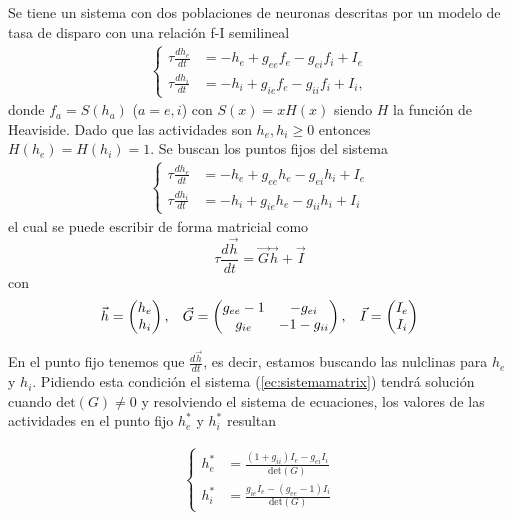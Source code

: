 \documentclass[11pt,twocolumn,twoside]{opticajnl}
\begin{document}
Se tiene un sistema con dos poblaciones de neuronas descritas por un modelo de tasa de disparo con una relación f-I semilineal
\begin{align}
    \left\{
    \begin{aligned}
    \tau \frac{d h_e}{dt} &= -h_e + g_{ee}f_e - g_{ei}f_i + I_e \\
    \tau \frac{d h_i}{dt} &= -h_i + g_{ie}f_e - g_{ii}f_i + I_i,
    \end{aligned}
\right.
\label{ec:sistema}
\end{align}
donde $f_a = S(h_a)$ ($a=e,i$) con $S(x) = x H(x) $ siendo $H$ la función de Heaviside. Dado que las actividades son $h_e, h_i \geq 0$ entonces $H(h_e) = H(h_i) = 1$. Se buscan los puntos fijos del sistema 
\begin{align}
    \left\{
    \begin{aligned}
        \tau \frac{d h_e}{dt} &= -h_e + g_{ee}h_e - g_{ei}h_i + I_e \\
        \tau \frac{d h_i}{dt} &= -h_i + g_{ie}h_e - g_{ii}h_i + I_i 
    \end{aligned}
    \right.
    \label{ec:sistema2}
\end{align}
el cual se puede escribir de forma matricial como 
\begin{equation}
    \tau \frac{d \vec{h}}{dt} = \vec{G} \vec{h} + \vec{I}
    \label{ec:sistemamatrix}
\end{equation}
con 
\[
\vec{h} = \begin{pmatrix} h_e \\ h_i \end{pmatrix}, \hspace{0.3cm}
\vec{G} = \begin{pmatrix} g_{ee} - 1 & -g_{ei} \\ g_{ie} & -1-g_{ii} \end{pmatrix}, \hspace{0.3cm}
\vec{I} = \begin{pmatrix} I_e \\ I_i \end{pmatrix}
\]

En el punto fijo tenemos que $ \frac{d \vec{h}}{dt} $, es decir, estamos buscando las nulclinas para $h_e$ y $h_i$. Pidiendo esta condición el sistema (\ref{ec:sistemamatrix}) tendrá solución cuando $\text{det}(G) \neq 0$ y resolviendo el sistema de ecuaciones, los valores de las actividades en el punto fijo $h_e^*$ y $h_i^*$ resultan

\begin{align}
    \left\{
    \begin{aligned}
        h_e^* &= \frac{ (1+g_{ii}) I_e - g_{ei}I_i }{\text{det}(G)} \\
        h_i^* &= \frac{ g_{ie} I_e - (g_{ee}-1)I_i }{\text{det}(G)}
    \end{aligned}
    \right.
    \label{ec:puntofijo}
\end{align}
\end{document}
